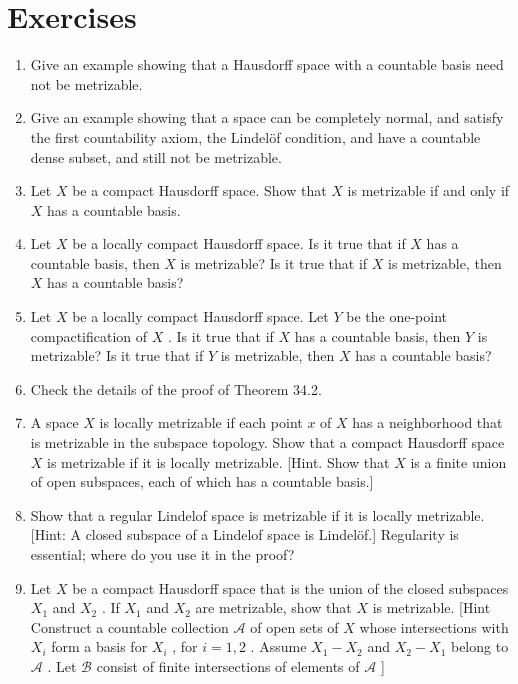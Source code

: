 \section*{Exercises}
\begin{enumerate}[itemsep=0.4em, parsep=0pt, topsep=0pt, partopsep=0pt, leftmargin=*, label=\arabic*., ref=\arabic*]
\item Give an example showing that a Hausdorff space with a countable basis need not be metrizable.
\item Give an example showing that a space can be completely normal, and satisfy the first countability axiom, the Lindelöf condition, and have a countable dense subset, and still not be metrizable.
\item Let \(X\) be a compact Hausdorff space. Show that \(X\) is metrizable if and only if \(X\) has a countable basis.
\item Let \(X\) be a locally compact Hausdorff space. Is it true that if \(X\) has a countable basis, then \(X\) is metrizable? Is it true that if \(X\) is metrizable, then \(X\) has a countable basis?
\item Let \(X\) be a locally compact Hausdorff space. Let \(Y\) be the one-point compactification of \(X\) . Is it true that if \(X\) has a countable basis, then \(Y\) is metrizable? Is it true that if \(Y\) is metrizable, then \(X\) has a countable basis?
\item Check the details of the proof of Theorem 34.2.
\item A space \(X\) is locally metrizable if each point \(x\) of \(X\) has a neighborhood that is metrizable in the subspace topology. Show that a compact Hausdorff space \(X\) is metrizable if it is locally metrizable. [Hint. Show that \(X\) is a finite union of open subspaces, each of which has a countable basis.]
\item Show that a  regular Lindelof space is metrizable if it is locally metrizable. [Hint: A closed subspace of a Lindelof space is Lindelöf.] Regularity is essential; where do you use it in the proof?
\item Let \(X\) be a compact Hausdorff space that is the union of the closed subspaces \({X}_{1}\) and \({X}_{2}\) . If \({X}_{1}\) and \({X}_{2}\) are metrizable, show that \(X\) is metrizable. [Hint Construct a countable collection \(\mathcal{A}\) of open sets of \(X\) whose intersections with \({X}_{i}\) form a basis for \({X}_{i}\) , for \(i = 1,2\) . Assume \({X}_{1} - {X}_{2}\) and \({X}_{2} - {X}_{1}\) belong to \(\mathcal{A}\) . Let \(\mathcal{B}\) consist of finite intersections of elements of \(\mathcal{A}\) ]
\end{enumerate}
